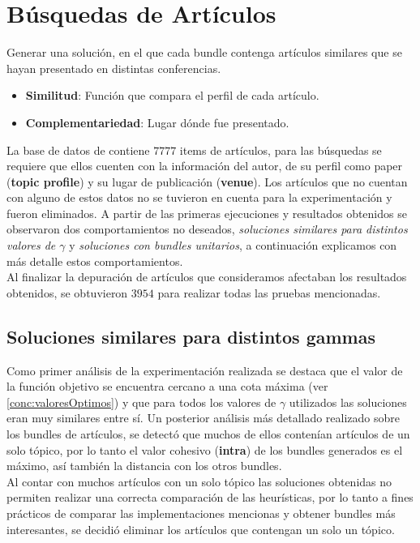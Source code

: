 \section{Búsquedas de Artículos}\label{res:busPaper}
Generar una solución, en el que cada bundle contenga artículos similares que se hayan presentado en distintas conferencias.\\
\begin{itemize}
  \item \textbf{Similitud}: Función que compara el perfil de cada artículo.
  \item \textbf{Complementariedad}: Lugar dónde fue presentado.
\end{itemize}

La base de datos de \cite{dataDrive} contiene $7777$ items de artículos, para las búsquedas se requiere que ellos cuenten con la información del autor, de su perfil como paper (\textbf{topic profile}) y su lugar de publicación (\textbf{venue}). Los artículos que no cuentan con alguno de estos datos no se tuvieron en cuenta para la experimentación y fueron eliminados. A partir de las primeras ejecuciones y resultados obtenidos se observaron dos comportamientos no deseados, \textit{soluciones similares para distintos valores de $\gamma$} y \textit{soluciones con bundles unitarios}, a continuación explicamos con más detalle estos comportamientos.\\
Al finalizar la depuración de artículos que consideramos afectaban los resultados obtenidos, se obtuvieron $3954$ para realizar todas las pruebas mencionadas.
\subsection{Soluciones similares para distintos gammas}
Como primer análisis de la experimentación realizada se destaca que el valor de la función objetivo se encuentra cercano a una cota máxima (ver \ref{conc:valoresOptimos}) y que para todos los valores de $\gamma$ utilizados las soluciones eran muy similares entre sí. Un posterior análisis más detallado realizado sobre los bundles de artículos, se detectó que muchos de ellos contenían artículos de un solo tópico, por lo tanto el valor cohesivo (\textbf{intra}) de los bundles generados es el máximo, así también la distancia con los otros bundles.\\
Al contar con muchos artículos con un solo tópico las soluciones obtenidas no permiten realizar una correcta comparación de las heurísticas, por lo tanto a fines prácticos de comparar las implementaciones mencionas y obtener bundles más interesantes, se decidió eliminar los artículos que contengan un solo un tópico.
